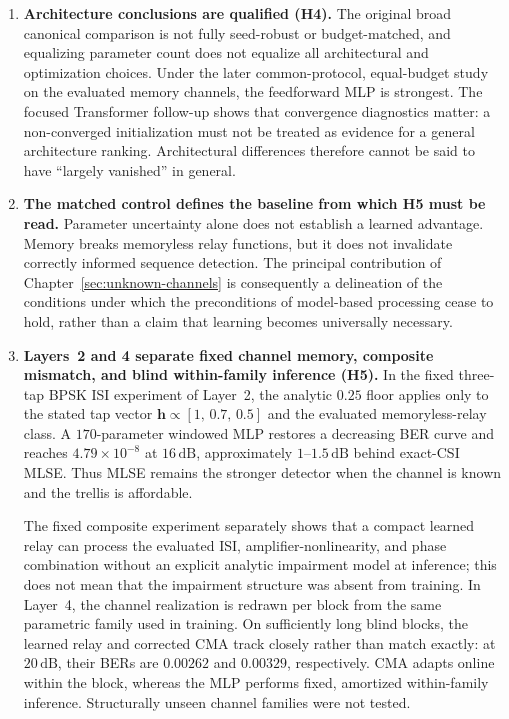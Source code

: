 \begin{enumerate}
    \item \textbf{Architecture conclusions are qualified (H4).}
    The original broad canonical comparison is not fully seed-robust or
    budget-matched, and equalizing parameter count does not equalize all
    architectural and optimization choices.  Under the later common-protocol,
    equal-budget study on the evaluated memory channels, the feedforward MLP
    is strongest.  The focused Transformer follow-up shows that convergence
    diagnostics matter: a non-converged initialization must not be treated as
    evidence for a general architecture ranking.  Architectural differences
    therefore cannot be said to have ``largely vanished'' in general.

    \item \textbf{The matched control defines the baseline from which H5 must
    be read.}
    Parameter uncertainty alone does not establish a learned advantage.
    Memory breaks memoryless relay functions, but it does not invalidate
    correctly informed sequence detection.  The principal contribution of
    Chapter~\ref{sec:unknown-channels} is consequently a delineation of the
    conditions under which the preconditions of model-based processing cease
    to hold, rather than a claim that learning becomes universally necessary.

    \item \textbf{Layers~2 and 4 separate fixed channel memory, composite
    mismatch, and blind within-family inference (H5).}
    In the fixed three-tap BPSK ISI experiment of Layer~2, the analytic
    \(0.25\) floor applies only to the stated tap vector
    \(\mathbf{h}\propto[1,\,0.7,\,0.5]\) and the evaluated memoryless-relay
    class.  A \(170\)-parameter windowed MLP restores a decreasing BER curve
    and reaches \(4.79\times10^{-8}\) at \(16\,\mathrm{dB}\), approximately
    \(1\)--\(1.5\,\mathrm{dB}\) behind exact-CSI MLSE.  Thus MLSE remains the
    stronger detector when the channel is known and the trellis is
    affordable.

    The fixed composite experiment separately shows that a compact learned
    relay can process the evaluated ISI, amplifier-nonlinearity, and phase
    combination without an explicit analytic impairment model at inference;
    this does not mean that the impairment structure was absent from
    training.  In Layer~4, the channel realization is redrawn per block from
    the same parametric family used in training.  On sufficiently long blind
    blocks, the learned relay and corrected CMA track closely rather than
    match exactly: at \(20\,\mathrm{dB}\), their BERs are \(0.00262\) and
    \(0.00329\), respectively.  CMA adapts online within the block, whereas
    the MLP performs fixed, amortized within-family inference.  Structurally
    unseen channel families were not tested.


\end{enumerate}
